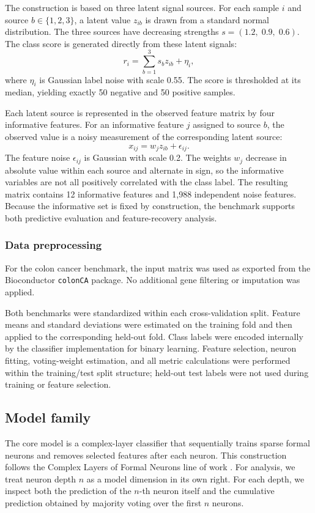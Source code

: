 The construction is based on three latent signal sources. For each sample $i$ and source
$b \in \{1,2,3\}$, a latent value $z_{ib}$ is drawn from a standard normal distribution. The three sources have
decreasing strengths $s=(1.2,\;0.9,\;0.6)$. The class score is generated directly from these latent signals:
\[
r_i=\sum_{b=1}^{3}s_b z_{ib}+\eta_i,
\]
where $\eta_i$ is Gaussian label noise with scale 0.55. The score is thresholded at its median, yielding
exactly 50 negative and 50 positive samples.

Each latent source is represented in the observed feature matrix by four informative features. For an
informative feature $j$ assigned to source $b$, the observed value is a noisy measurement of the corresponding
latent source:
\[
x_{ij}=w_j z_{ib}+\epsilon_{ij}.
\]
The feature noise $\epsilon_{ij}$ is Gaussian with scale 0.2. The weights $w_j$ decrease in absolute value
within each source and alternate in sign, so the informative variables are not all positively correlated with
the class label. The resulting matrix contains 12 informative features and 1,988 independent noise features.
Because the informative set is fixed by construction, the benchmark supports both predictive evaluation and
feature-recovery analysis.

\subsubsection*{Data preprocessing}
For the colon cancer benchmark, the input matrix was used as exported from the Bioconductor
\texttt{colonCA} package. No additional gene filtering or imputation was applied.

Both benchmarks were standardized within each cross-validation split. Feature means and standard deviations
were estimated on the training fold and then applied to the corresponding held-out fold. Class labels were
encoded internally by the classifier implementation for binary learning. Feature selection, neuron fitting,
voting-weight estimation, and all metric calculations were performed within the training/test split structure;
held-out test labels were not used during training or feature selection.

\subsection*{Model family}
The core model is a complex-layer classifier that sequentially trains sparse formal neurons and removes selected
features after each neuron. This construction follows the Complex Layers of Formal Neurons line of work
\cite{bobrowski2021,bobrowski2022}. For analysis, we treat neuron depth $n$ as a model dimension in its own
right. For each depth, we inspect both the prediction of the $n$-th neuron itself and the cumulative prediction
obtained by majority voting over the first $n$ neurons.

